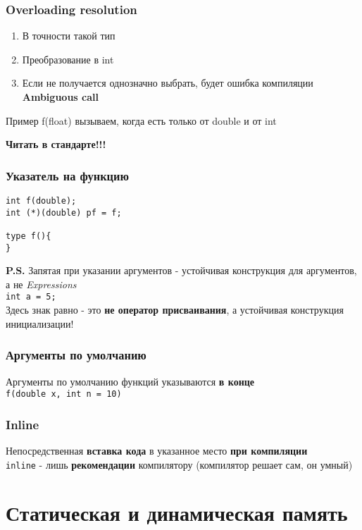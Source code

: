 \documentclass[12pt, a5paper]{article}
\begin{document}
\subsubsection{Overloading resolution}
\begin{enumerate}
\item В точности такой тип
\item Преобразование в int
\item Если не получается однозначно выбрать, будет ошибка компиляции \textbf{Ambiguous call}
\end{enumerate}

Пример f(float) вызываем, когда есть только от double и от int
\begin{center}
\textbf{Читать в стандарте!!!}
\end{center}

\subsubsection{Указатель на функцию}

\begin{lstlisting}
int f(double);
int (*)(double) pf = f;

type f(){
}
\end{lstlisting}

\textbf{P.S.} Запятая при указании аргументов - устойчивая конструкция для аргументов, а не \textit{Expressions}
\\
\texttt{int a = 5;} 
\\
Здесь знак равно - это \textbf{не оператор присваивания}, а устойчивая конструкция инициализации!

\subsubsection{Аргументы по умолчанию}
Аргументы по умолчанию функций указываются \textbf{в конце}
\\ \texttt{f(double x, int n = 10)}

\subsubsection{Inline}
Непосредственная \textbf{вставка кода} в указанное место \textbf{при компиляции}
\\
\texttt{inline} - лишь \textbf{рекомендации} компилятору (компилятор решает сам, он умный)


\section{Статическая и динамическая память}
\end{document}
